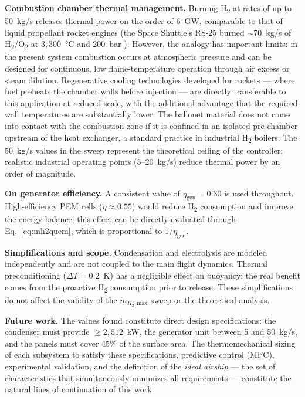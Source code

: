 \documentclass[aerospace,article,submit,pdftex,moreauthors]{Definitions/mdpi}
\newcommand{\dotmmax}{\dot{m}_{H_2,\text{max}}}
\begin{document}
\textbf{Combustion chamber thermal management.} Burning H\textsubscript{2} at rates of up to 50~kg/s releases thermal power on the order of 6~GW, comparable to that of liquid propellant rocket engines (the Space Shuttle's RS-25 burned $\sim\!70$~kg/s of H\textsubscript{2}/O\textsubscript{2} at $3{,}300$~°C and 200~bar \cite{ref11}). However, the analogy has important limits: in the present system combustion occurs at atmospheric pressure and can be designed for continuous, low flame-temperature operation through air excess or steam dilution. Regenerative cooling technologies developed for rockets — where fuel preheats the chamber walls before injection — are directly transferable to this application at reduced scale, with the additional advantage that the required wall temperatures are substantially lower. The ballonet material does not come into contact with the combustion zone if it is confined in an isolated pre-chamber upstream of the heat exchanger, a standard practice in industrial H\textsubscript{2} boilers. The 50~kg/s values in the sweep represent the theoretical ceiling of the controller; realistic industrial operating points (5--20~kg/s) reduce thermal power by an order of magnitude.

\textbf{On generator efficiency.} A consistent value of $\eta_\text{gen}=0.30$ is used throughout. High-efficiency PEM cells ($\eta\approx0.55$) would reduce H\textsubscript{2} consumption and improve the energy balance; this effect can be directly evaluated through Eq.~\eqref{eq:mh2quem}, which is proportional to $1/\eta_\text{gen}$.

\textbf{Simplifications and scope.} Condensation and electrolysis are modeled independently and are not coupled to the main flight dynamics. Thermal preconditioning ($\Delta T=0.2$~K) has a negligible effect on buoyancy; the real benefit comes from the proactive H\textsubscript{2} consumption prior to release. These simplifications do not affect the validity of the $\dotmmax$ sweep or the theoretical analysis.

\textbf{Future work.} The values found constitute direct design specifications: the condenser must provide $\geq2{,}512$~kW, the generator unit between 5 and 50~kg/s, and the panels must cover 45\% of the surface area. The thermomechanical sizing of each subsystem to satisfy these specifications, predictive control (MPC), experimental validation, and the definition of the \emph{ideal airship} — the set of characteristics that simultaneously minimizes all requirements — constitute the natural lines of continuation of this work.
\end{document}
